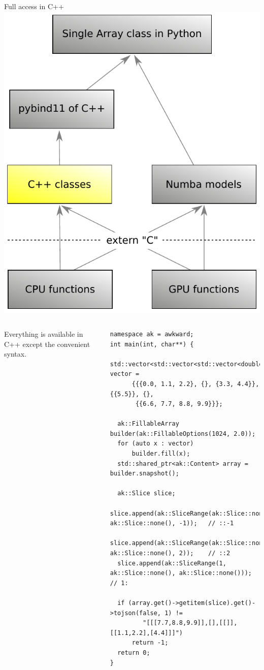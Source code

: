 \documentclass[aspectratio=169]{beamer}
\begin{document}
\begin{frame}[fragile]{Full access in C++}
\large
\vspace{0.5 cm}
\hfill\mbox{\includegraphics[height=4 cm]{awkward-1-0-layers-mini-cpp.pdf}\hspace{-0.75 cm}}

\vspace{-4 cm}
\begin{columns}
Everything is available in C++ except the convenient syntax.

\scriptsize
\begin{verbatim}
namespace ak = awkward;
int main(int, char**) {
  std::vector<std::vector<std::vector<double>>> vector =
      {{{0.0, 1.1, 2.2}, {}, {3.3, 4.4}}, {{5.5}}, {},
       {{6.6, 7.7, 8.8, 9.9}}};

  ak::FillableArray builder(ak::FillableOptions(1024, 2.0));
  for (auto x : vector)
      builder.fill(x);
  std::shared_ptr<ak::Content> array = builder.snapshot();

  ak::Slice slice;
  slice.append(ak::SliceRange(ak::Slice::none(), ak::Slice::none(), -1));   // ::-1
  slice.append(ak::SliceRange(ak::Slice::none(), ak::Slice::none(), 2));    // ::2
  slice.append(ak::SliceRange(1, ak::Slice::none(), ak::Slice::none()));    // 1:

  if (array.get()->getitem(slice).get()->tojson(false, 1) !=
         "[[[7.7,8.8,9.9]],[],[[]],[[1.1,2.2],[4.4]]]")
      return -1;
  return 0;
}
\end{verbatim}
\end{columns}
\end{frame}
\end{document}
